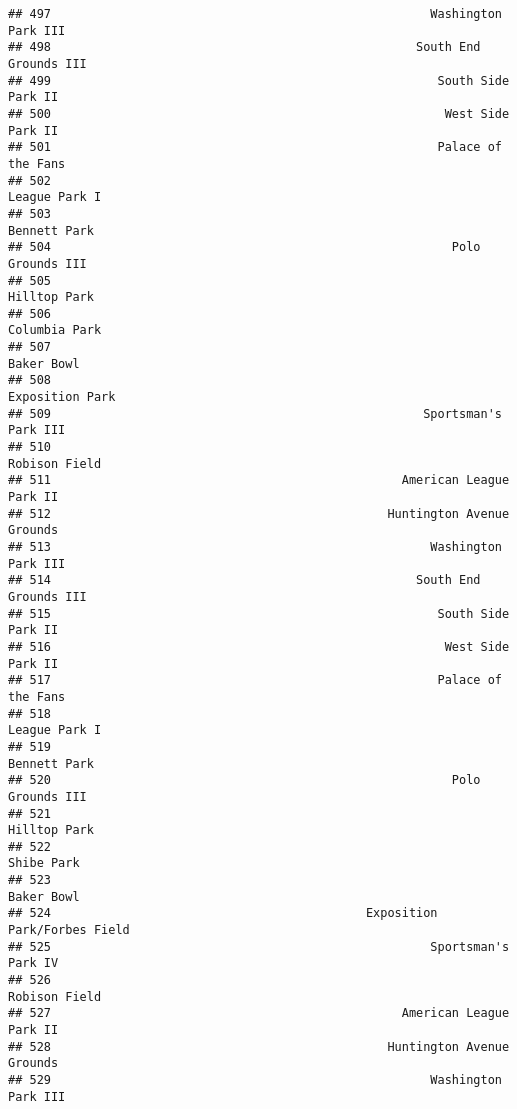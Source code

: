 \documentclass[]{article}
\begin{document}
\begin{verbatim}
## 497                                                     Washington Park III
## 498                                                   South End Grounds III
## 499                                                      South Side Park II
## 500                                                       West Side Park II
## 501                                                      Palace of the Fans
## 502                                                           League Park I
## 503                                                            Bennett Park
## 504                                                        Polo Grounds III
## 505                                                            Hilltop Park
## 506                                                           Columbia Park
## 507                                                              Baker Bowl
## 508                                                         Exposition Park
## 509                                                    Sportsman's Park III
## 510                                                           Robison Field
## 511                                                 American League Park II
## 512                                               Huntington Avenue Grounds
## 513                                                     Washington Park III
## 514                                                   South End Grounds III
## 515                                                      South Side Park II
## 516                                                       West Side Park II
## 517                                                      Palace of the Fans
## 518                                                           League Park I
## 519                                                            Bennett Park
## 520                                                        Polo Grounds III
## 521                                                            Hilltop Park
## 522                                                              Shibe Park
## 523                                                              Baker Bowl
## 524                                            Exposition Park/Forbes Field
## 525                                                     Sportsman's Park IV
## 526                                                           Robison Field
## 527                                                 American League Park II
## 528                                               Huntington Avenue Grounds
## 529                                                     Washington Park III

\end{verbatim}
\end{document}
